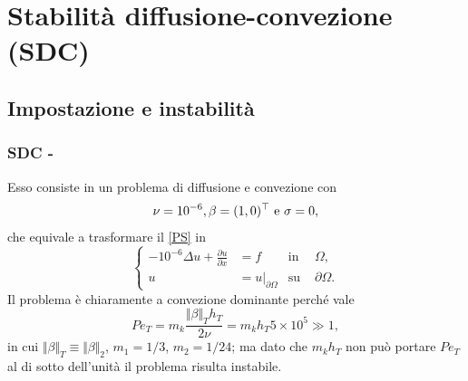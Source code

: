 \documentclass[11pt]{beamer}
\newcommand{\derP}[2]{\frac{\partial#1}{\partial#2}}
\newcommand{\SpaziaturaMate}[3]{
    \setlength{\thinmuskip}{#1mu}
    \setlength{\medmuskip}{#2mu}
    \setlength{\thickmuskip}{#3mu}
}
\newcommand{\teqref}[2]{\hyperref[#1]{#2}}
\begin{document}
        \section{Stabilità diffusione-convezione (SDC)}
        \renewcommand{\titoloSez}{SDC}
        
            \subsection{Impostazione e instabilità}
   
                \begin{frame}\frametitle{\titoloSez{} - \insertsubsection{}}
                    Esso consiste in un problema di diffusione e convezione con
                    \begin{equation*}
                        \setlength{\abovedisplayskip}{5pt plus 2pt minus 2pt}  %
                        \setlength{\belowdisplayskip}{5pt plus 2pt minus 2pt}  %
                        \nu=10^{-6}, \beta=(1,0)^{\top}\text{ e }\sigma=0,
                    \end{equation*}
                    che equivale a trasformare il \teqref{eqProblemaStazionario}{[PS]} in
                    \begin{equation*}
                        \left\{
                        \begin{aligned}
                            -10^{-6}\Delta u+\derP ux&=f&\text{in }&\Omega, \\
                            u&=u\vert_{\partial\Omega}&\text{su }&\partial\Omega.
                        \end{aligned}
                        \right.
                        \label{eqSDC}
                    \end{equation*}
                    Il problema è chiaramente a convezione dominante perché vale
                    \begin{equation*}
                        Pe_T=m_k\frac{\Vert\beta\Vert_Th_T}{2\nu}=m_kh_T5\times10^5\gg1,
                        \label{eqNumeroPeclet}
                    \end{equation*}
                    in cui $\Vert\beta\Vert_T\equiv\Vert\beta\Vert_2$, $m_1=1/3$, $m_2=1/24$; ma dato che $m_kh_T$ non può portare $Pe_T$ al di sotto dell'unità il problema risulta instabile.
                \end{frame}
\end{document}

